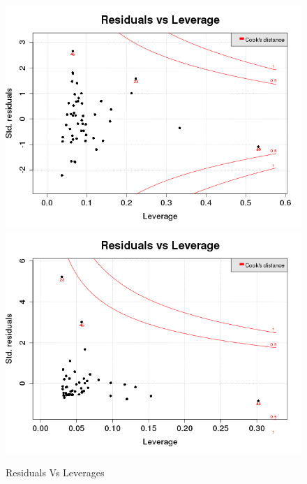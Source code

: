 \begin{figure}[p]
\begin{center}
    \includegraphics[scale=0.4]{imgOT/model1-drawResidualsVsLeverages.png}\hspace*{1cm}
	\includegraphics[scale=0.4]{imgOT/model2-drawResidualsVsLeverages.png}\\
  \end{center}
  \caption{Residuals Vs Leverages}
\end{figure}

